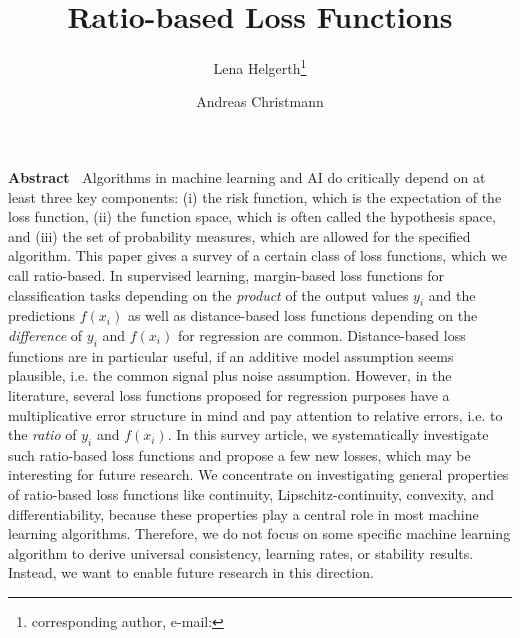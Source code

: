 \documentclass[10pt]{article}
\title{\textbf{Ratio-based Loss Functions}}
\author[1]{Lena Helgerth\thanks{corresponding author, e-mail: \email{lena.helgerth@uni-bayreuth.de}}}
\author[1]{Andreas Christmann}
\affil[1]{Department of Mathematics, University of Bayreuth, Chair of Stochastics and Machine Learning, 95440 Bayreuth, Germany}
\begin{document}

\pagestyle{headings}

\maketitle

\textbf{Abstract~} {\small 
	Algorithms in machine learning and AI do critically depend on at least three key components: (i) the risk function, which is the expectation of the loss function, (ii) the function space, which is often called the hypothesis space, and (iii) the set of probability measures, which are allowed for the specified algorithm. 
	This paper gives a survey of a certain class of loss functions, which we call ratio-based. 
	In supervised learning, margin-based loss functions for classification tasks depending on the \emph{product} of the output values $y_i$ and the predictions $f(x_i)$  as well as distance-based loss functions depending on the \emph{difference} of $y_i$ and $f(x_i)$ for regression are common.
	Distance-based loss functions are in particular useful, if an additive model assumption seems plausible, i.e. the common signal plus noise assumption.
	However, in the literature, several loss functions proposed for regression purposes have a multiplicative error structure in mind and pay attention to relative errors, i.e. to the \emph{ratio} of $y_i$ and $f(x_i)$.
	In this survey article, we systematically investigate such ratio-based loss functions and propose a few new losses, which may be interesting for future research. 
	We concentrate on investigating general properties of ratio-based loss functions like continuity, Lipschitz-continuity, convexity, and differentiability, because these properties play a central role in most machine learning algorithms.
	Therefore, we do not focus on some specific machine learning algorithm to derive universal consistency, learning rates, or stability results.
	Instead, we want to enable future research in this direction.
}
\end{document}

